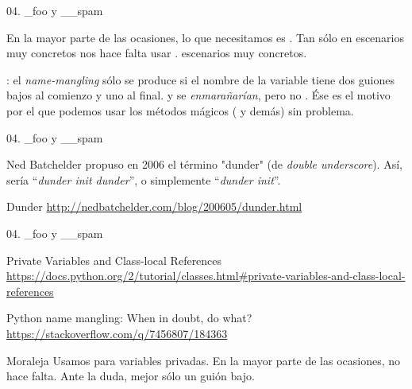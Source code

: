 \begin{frame}{04. \_foo y \_\_spam}
  \begin{alertblock}{}
    \centering En la mayor parte de las ocasiones, lo que necesitamos
    es . Tan sólo en escenarios muy concretos nos hace
    falta usar .
    escenarios muy concretos.
  \end{alertblock}

  \begin{justify}
    \small
    : el \textit{name-mangling} sólo se produce si
    el nombre de la variable tiene dos guiones bajos al comienzo y
     uno al final.  y
     se \textit{enmarañarían}, pero no
    . Ése es el motivo por el que podemos usar
    los métodos mágicos ( y demás) sin
    problema.
  \end{justify}
\end{frame}

\begin{frame}{04. \_foo y \_\_spam}
  \begin{center}
    Ned Batchelder propuso en 2006 el término "dunder" (de
    \textit{double underscore}). Así,  sería
    ``\textit{dunder init dunder}'', o simplemente ``\textit{dunder
      init}''.
  \end{center}

  \small
  \begin{block}{\centering Dunder}
    \centering \url{http://nedbatchelder.com/blog/200605/dunder.html}
  \end{block}
\end{frame}

\begin{frame}{04. \_foo y \_\_spam}
  \footnotesize
  \begin{block}{\centering Private Variables and Class-local References}
    \centering \url{https://docs.python.org/2/tutorial/classes.html\#private-variables-and-class-local-references}
  \end{block}

  \begin{block}{\centering Python name mangling: When in doubt, do what?}
    \centering \url{https://stackoverflow.com/q/7456807/184363}
  \end{block}

  \vspace{0.25cm}

  \normalsize
  \begin{alertblock}{\centering Moraleja}
    \centering Usamos  para variables privadas. En la
    mayor parte de las ocasiones,  no hace
    falta. Ante la duda, mejor sólo un guión bajo.
  \end{alertblock}
\end{frame}
